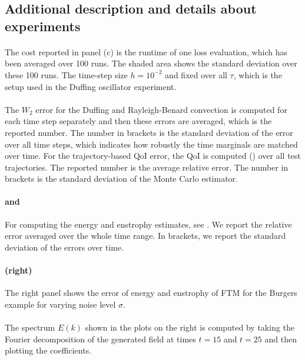 \documentclass[oneside,11pt]{article}
\theoremstyle{remark}
\begin{document}
\subsection{Additional description and details about experiments}

\paragraph{} The cost reported in panel (c) is the runtime of one loss evaluation, which has been averaged over 100 runs. The shaded area shows the standard deviation over these 100 runs. The time-step size $h = 10^{-2}$ and fixed over all $\tau$, which is the setup used in the Duffing oscillator experiment. 



\paragraph{} The $W_2$ error for the Duffing and Rayleigh-Benard convection is computed for each time step separately and then these errors are averaged, which is the reported number. The number in brackets is the standard deviation of the error over all time steps, which indicates how robustly the time marginals are matched over time. For the trajectory-based QoI error, the QoI is computed () over all test trajectories. The reported number is the average relative error. The number in brackets is the standard deviation of the Monte Carlo estimator.  

\paragraph{ and } For computing the energy and enstrophy estimates, see . We report the relative error averaged over the whole time range. In brackets, we report the standard deviation of the errors over time. 

\paragraph{(right)} The right panel shows the error of energy and enstrophy of FTM for the Burgers example for varying noise level $\sigma$. 

\paragraph{} The spectrum $E(k)$ shown in the plots on the right is computed by taking the Fourier decomposition of the generated field at times $t = 15$ and $t = 25$ and then plotting the coefficients.  
\end{document}
